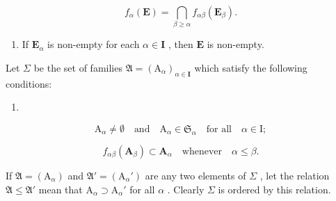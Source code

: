 \[
f _ {\alpha} (\mathbf {E}) = \bigcap_ {\beta \geqslant \alpha} f _ {\alpha \beta} (\mathbf {E} _ {\beta}).\tag{19}
\]

\begin{enumerate}
\def\labelenumi{(\alph{enumi})}
\setcounter{enumi}{1}
\tightlist
\item
  If \(\mathbf{E}_{\alpha}\) is non-empty for each \(\alpha \in \mathbf{I}\) , then \(\mathbf{E}\) is non-empty.
\end{enumerate}

Let \(\Sigma\) be the set of families \(\mathfrak{A} = (\mathrm{A}_{\alpha})_{\alpha \in \mathbf{I}}\) which satisfy the following conditions:

\begin{enumerate}
\def\labelenumi{(\arabic{enumi})}
\setcounter{enumi}{19}
\tightlist
\item
\end{enumerate}

\[
\mathrm{A} _ {\alpha} \neq \emptyset \quad \text{and} \quad \mathrm{A} _ {\alpha} \in \mathfrak {S} _ {\alpha} \quad \text{for all} \quad \alpha \in \mathrm{I};\tag{21}
\]

\[
f _ {\alpha \beta} (\mathbf {A} _ {\beta}) \subset \mathbf {A} _ {\alpha} \quad \text{whenever} \quad \alpha \leqslant \beta .
\]

If \(\mathfrak{A} = (\mathrm{A}_{\alpha})\) and \(\mathfrak{A}' = (\mathrm{A}_{\alpha}')\) are any two elements of \(\Sigma\) , let the relation \(\mathfrak{A} \leqslant \mathfrak{A}'\) mean that \(\mathrm{A}_{\alpha} \supset \mathrm{A}_{\alpha}'\) for all \(\alpha\) . Clearly \(\Sigma\) is ordered by this relation.

